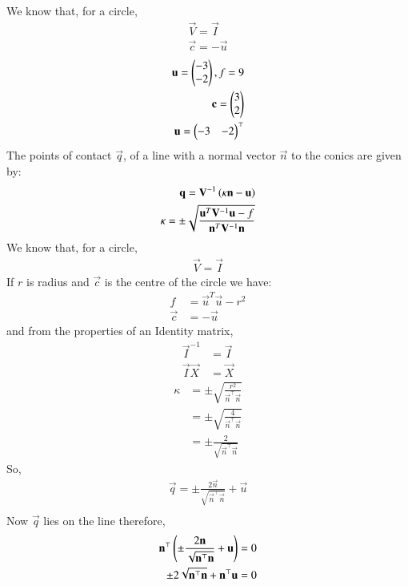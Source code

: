 \documentclass[journal,12pt,twocolumn]{IEEEtran}
\begin{document}
We know that, for a circle,
\begin{align}
    \vec{V} = \vec{I}\\
    \vec{c} = -\vec{u}
\end{align}
\begin{align}
   \mathbf{u} = \begin{pmatrix}-3 \\ -2\end{pmatrix}, f=9\\
   \mathbf{c}=\begin{pmatrix}3 \\ 2\end{pmatrix}\\
    \mathbf{u}=\begin{pmatrix}-3 &-2\end{pmatrix}^\top 
\end{align}
The points of contact $\vec{q}$, of a line with a normal vector $\vec{n}$ to the conics are given by:
\begin{align}
\mathbf{q} = \mathbf{V}^{-1}\left(\kappa \mathbf{n}-\mathbf{u}\right) \label{eq:9} \\
\kappa = \pm \sqrt{\frac{\mathbf{u}^T\mathbf{V}^{-1}\mathbf{u}-f}{\mathbf{n}^T\mathbf{V}^{-1}\mathbf{n}}}\label{eq:10}
\end{align}
We know that, for a circle, 
\begin{align}
\vec{V} = \vec{I}\label{eq:11}  
\end{align}
If $r$ is radius and $\vec{c}$ is the centre of the circle we have:
\begin{align}
f &=\vec{u}^T\vec{u}-r^2  \label{eq:5} \\  
\vec{c} &=-\vec{u}
\end{align}
and from the properties of an Identity matrix, 
\begin{align}
\vec{I}^{-1} &= \vec{I} \\
\vec{I}\vec{X} &= \vec{X}   
\end{align}
\begin{align}
\kappa &= \pm \sqrt{\frac{r^2}{\vec{n}^{\top}\vec{n}}} \\
&= \pm \sqrt{\frac{4}{\vec{n}^{\top}\vec{n}}} \\
& =  \pm \frac{2}{\sqrt{\vec{n}^{\top}\vec{n}}}
\end{align}
So,
\begin{align}
    \vec{q}= \pm \frac{2 \vec{n}}{\sqrt{\vec{n}^{\top}\vec{n}}}+ \vec{u}\\
\end{align}
Now $\vec{q}$ lies on the line therefore,
\begin{align}
   \mathbf{n}^{\top} \left(\pm \frac{2 \mathbf{n}}{\sqrt{\mathbf{n}^{\top}\mathbf{n}}}+ \mathbf{u} \right) = 0\\
   \pm 2 \sqrt{\mathbf{n}^{\top}\mathbf{n}}+ \mathbf{n}^{\top}\mathbf{u}=0
\end{align}
\end{document}
